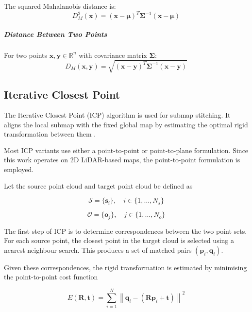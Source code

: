 \documentclass[11pt]{article}
\begin{document}
The squared Mahalanobis distance is:
\begin{equation}
	D_M^2(\mathbf{x}) = (\mathbf{x} - \boldsymbol{\mu})^T \boldsymbol{\Sigma}^{-1} (\mathbf{x} - \boldsymbol{\mu})
\end{equation}

\subparagraph{Distance Between Two Points}

For two points $\mathbf{x}, \mathbf{y} \in \mathbb{R}^n$ with covariance matrix $\boldsymbol{\Sigma}$:
\begin{equation}
	D_M(\mathbf{x}, \mathbf{y}) = \sqrt{(\mathbf{x} - \mathbf{y})^T \boldsymbol{\Sigma}^{-1} (\mathbf{x} - \mathbf{y})}
\end{equation}


\subsection{Iterative Closest Point}

The Iterative Closest Point (ICP) algorithm is used for submap stitching. 
It aligns the local submap with the fixed global map by estimating the optimal 
rigid transformation between them \cite{Besl}. 

Most ICP variants use either a point-to-point or point-to-plane formulation. 
Since this work operates on 2D LiDAR-based maps, the point-to-point formulation is employed.

Let the source point cloud and target point cloud be defined as

\begin{equation}
	\mathcal{S} = \{\mathbf{s}_i\}, \quad i \in \{1, \dots, N_s\}
\end{equation}

\begin{equation}
	\mathcal{O} = \{\mathbf{o}_j\}, \quad j \in \{1, \dots, N_o\}
\end{equation}

The first step of ICP is to determine correspondences between the two point sets. 
For each source point, the closest point in the target cloud is selected using 
a nearest-neighbour search. This produces a set of matched pairs 
$(\mathbf{p}_i, \mathbf{q}_i)$.

Given these correspondences, the rigid transformation is estimated by minimising 
the point-to-point cost function

\begin{equation}
	E(\mathbf{R}, \mathbf{t}) = \sum_{i=1}^{N} 
	\left\| \mathbf{q}_i - (\mathbf{R}\mathbf{p}_i + \mathbf{t}) \right\|^2
\end{equation}
\end{document}
